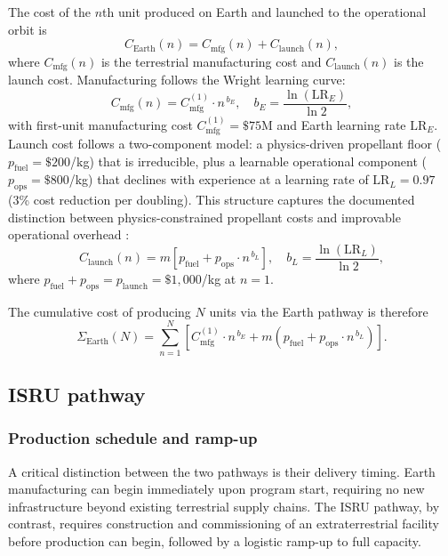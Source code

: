 \documentclass[preprint,12pt]{elsarticle}
\begin{document}
The cost of the $n$th unit produced on Earth and launched to the operational orbit is
\begin{equation}
  C_{\mathrm{Earth}}(n) = C_{\mathrm{mfg}}(n) + C_{\mathrm{launch}}(n),
  \label{eq:earth_unit}
\end{equation}
where $C_{\mathrm{mfg}}(n)$ is the terrestrial manufacturing cost and $C_{\mathrm{launch}}(n)$ is the launch cost. Manufacturing follows the Wright learning curve:
\begin{equation}
  C_{\mathrm{mfg}}(n) = C_{\mathrm{mfg}}^{(1)} \cdot n^{\,b_E}, \quad b_E = \frac{\ln(\mathrm{LR}_E)}{\ln 2},
  \label{eq:earth_mfg}
\end{equation}
with first-unit manufacturing cost $C_{\mathrm{mfg}}^{(1)} = \$75$M and Earth learning rate $\mathrm{LR}_E$. Launch cost follows a two-component model: a physics-driven propellant floor ($p_{\mathrm{fuel}} = \$200$/kg) that is irreducible, plus a learnable operational component ($p_{\mathrm{ops}} = \$800$/kg) that declines with experience at a learning rate of $\mathrm{LR}_L = 0.97$ (3\% cost reduction per doubling). This structure captures the documented distinction between physics-constrained propellant costs and improvable operational overhead \cite{zapata2019}:
\begin{equation}
  C_{\mathrm{launch}}(n) = m \left[ p_{\mathrm{fuel}} + p_{\mathrm{ops}} \cdot n^{\,b_L} \right], \quad b_L = \frac{\ln(\mathrm{LR}_L)}{\ln 2},
  \label{eq:earth_launch}
\end{equation}
where $p_{\mathrm{fuel}} + p_{\mathrm{ops}} = p_{\mathrm{launch}} = \$1{,}000$/kg at $n = 1$.

The cumulative cost of producing $N$ units via the Earth pathway is therefore
\begin{equation}
  \Sigma_{\mathrm{Earth}}(N) = \sum_{n=1}^{N} \left[ C_{\mathrm{mfg}}^{(1)} \cdot n^{\,b_E} + m \left( p_{\mathrm{fuel}} + p_{\mathrm{ops}} \cdot n^{\,b_L} \right) \right].
  \label{eq:earth_cum}
\end{equation}

\subsection{ISRU pathway}

\subsubsection{Production schedule and ramp-up}

A critical distinction between the two pathways is their delivery timing. Earth manufacturing can begin immediately upon program start, requiring no new infrastructure beyond existing terrestrial supply chains. The ISRU pathway, by contrast, requires construction and commissioning of an extraterrestrial facility before production can begin, followed by a logistic ramp-up to full capacity.
\end{document}
